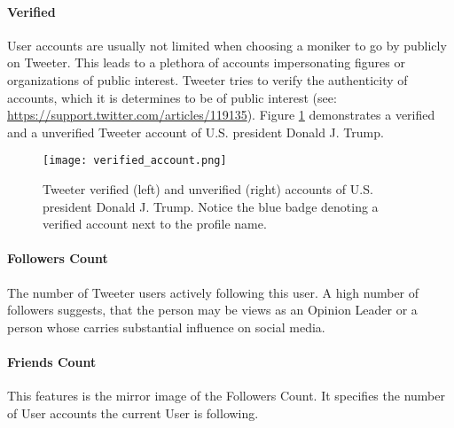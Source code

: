 			\paragraph{Verified}	
				User accounts are usually not limited when choosing a moniker to go by publicly on Tweeter. This leads to a plethora of accounts impersonating figures or organizations of public interest. Tweeter tries to verify the authenticity of accounts, which it is determines to be of public interest (see: \url{https://support.twitter.com/articles/119135}). Figure \ref{fig:verified_accounts} demonstrates a verified and a unverified Tweeter account of U.S. president Donald J. Trump.\\

				
				\begin{figure}[h]
					\centering
					\captionsetup{width=0.8\textwidth}
					\texttt{[image: verified\_account.png]}
					\caption[Tweeter Verified Accounts]{
						\footnotesize{
							Tweeter verified (left) and unverified (right) accounts of U.S. president Donald J. Trump. Notice the blue badge denoting a verified account next to the profile name.
						}
					} 
					\label{fig:verified_accounts}
				\end{figure}
			
			\paragraph{Followers Count}
				The number of Tweeter users actively following this user. A high number of followers suggests, that the person may be views as an Opinion Leader or a person whose carries substantial influence on social media.
				
			\paragraph{Friends Count}
				This features is the mirror image of the Followers Count. It specifies the number of User accounts the current User is following.
					

